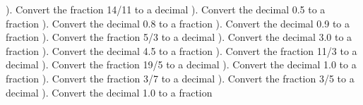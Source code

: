 \documentclass{article}%
\begin{document}
\newline%
). Convert the fraction 14/11 to a decimal%
\newline%
\newline%
). Convert the decimal 0.5 to a fraction%
\newline%
\newline%
). Convert the decimal 0.8 to a fraction%
\newline%
\newline%
). Convert the decimal 0.9 to a fraction%
\newline%
\newline%
). Convert the fraction 5/3 to a decimal%
\newline%
\newline%
). Convert the decimal 3.0 to a fraction%
\newline%
\newline%
). Convert the decimal 4.5 to a fraction%
\newline%
\newline%
). Convert the fraction 11/3 to a decimal%
\newline%
\newline%
). Convert the fraction 19/5 to a decimal%
\newline%
\newline%
). Convert the decimal 1.0 to a fraction%
\newline%
\newline%
). Convert the fraction 3/7 to a decimal%
\newline%
\newline%
). Convert the fraction 3/5 to a decimal%
\newline%
\newline%
). Convert the decimal 1.0 to a fraction%
\newline%
\newline%
\newline%
\end{document}
